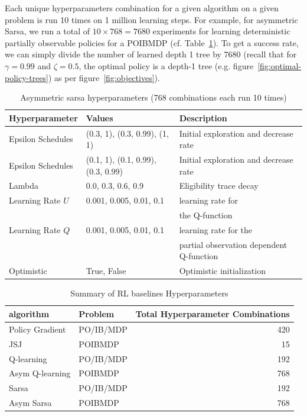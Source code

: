 Each unique hyperparameters combination for a given algorithm on a given problem is run 10 times on 1 million learning steps.
For example, for asymmetric Sarsa, we run a total of $10\times 768= 7680$ experiments for learning deterministic partially observable policies for a POIBMDP (cf. Table~\ref{tab:hp-sarsa}).
To get a success rate, we can simply divide the number of learned depth 1 tree by 7680 (recall that for $\gamma=0.99$ and $\zeta=0.5$, the optimal policy is a depth-1 tree (e.g. figure~\ref{fig:optimal-policy-trees}) as per figure~\ref{fig:objectives}). 

\begin{table}
\centering
\small
\caption{Asymmetric sarsa hyperparameters (768 combinations each run 10 times)}\label{tab:hp-sarsa}
\begin{tabular}{lll}
\toprule
\textbf{Hyperparameter} & \textbf{Values} & \textbf{Description} \\
\midrule
Epsilon Schedules & (0.3, 1), (0.3, 0.99), (1, 1) & Initial exploration and decrease rate \\
Epsilon Schedules & (0.1, 1), (0.1, 0.99), (0.3, 0.99) & Initial exploration and decrease rate \\
Lambda & 0.0, 0.3, 0.6, 0.9 & Eligibility trace decay \\
Learning Rate $U$ & 0.001, 0.005, 0.01, 0.1 & learning rate for \\
 & & the Q-function \\
Learning Rate $Q$ & 0.001, 0.005, 0.01, 0.1 & learning rate for the \\
 & & partial observation dependent Q-function \\
Optimistic & True, False & Optimistic initialization \\
\bottomrule
\end{tabular}
\end{table}

\begin{table}
    \centering
    \caption{Summary of RL baselines Hyperparameters}\label{tab:ib-params}
    \begin{tabular}{llr}
    \toprule
    \textbf{algorithm} & \textbf{Problem} & \textbf{Total Hyperparameter Combinations} \\
    \midrule
    Policy Gradient & PO/IB/MDP & 420 \\
    JSJ & POIBMDP & 15 \\
    Q-learning & PO/IB/MDP & 192 \\
    Asym Q-learning & POIBMDP & 768 \\
    Sarsa & PO/IB/MDP & 192 \\
    Asym Sarsa & POIBMDP & 768 \\
    \bottomrule
    \end{tabular}
    \end{table}



